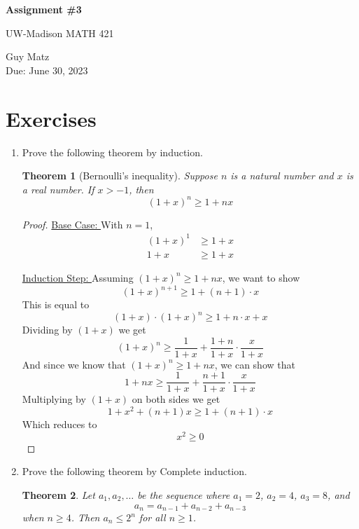 \documentclass{article} %
\theoremstyle{plain}
\newtheorem*{theorem*}{Theorem}
\theoremstyle{definition}
\theoremstyle{case}
\begin{document}
\begin{center}
\Large{\textbf{Assignment \#3}
            
UW-Madison MATH 421} %
\vspace{5pt}
        
\normalsize{  Guy Matz%
        \\ Due: June 30, 2023}
\vspace{15pt}
\end{center}

\section*{Exercises}%
\begin{enumerate}[label={\fbox{\textbf{Exercise \#\arabic* :}}}]
\item Prove the following theorem by induction.  

  \begin{theorem*}[Bernoulli's inequality] Suppose $n$ is a natural
    number and $x$ is a real number. If $x > -1$, then 
    \[ (1+x)^n \geq 1 + nx \]
  \end{theorem*} 

  \begin{proof}
    \underline{Base Case: } With $n=1$,
    \begin{align*}
      (1 + x)^1 &\geq 1 + x \\
      1 + x &\geq 1 + x
    \end{align*}

    \underline{Induction Step: } Assuming $(1+x)^n \geq 1 + nx $, we want
    to show 
    \[ (1+x)^{n+1} \geq 1 + (n+1) \cdot x \]
    This is equal to 
      \[ (1+x) \cdot (1+x)^n \geq 1 + n \cdot x  + x\]
      Dividing by $(1+x)$ we get 
      \[ (1+x)^n \geq \frac{1}{1+x} + \frac{1+n}{1+x} \cdot \frac{x}{1+x} \]
      And since we know that $(1+x)^n \geq 1 + nx $, we can show that
        \[ 1 + n x  \geq \frac{1}{1+x} + \frac{n+1}{1+x} \cdot \frac{x}{1+x} \]
        Multiplying by $(1+x)$ on both sides we get
        \[ 1 + x^2 + (n+1) x  \geq 1 + (n+1) \cdot x \]
        Which reduces to
        \[ x^2 \geq 0 \]
      \end{proof}

\newpage
\item Prove the following theorem by Complete induction.  

 \begin{theorem*} Let $a_1,a_2,\dots$ be the sequence where $a_1=2$, $a_2=4$, $a_3=8$, and 
 $$a_n = a_{n-1}+a_{n-2}+a_{n-3}$$ 
 when $n \geq 4$. Then $a_n \leq 2^n$ for all $n \geq 1$. 
 

\end{theorem*}
\end{enumerate}
\end{document}

